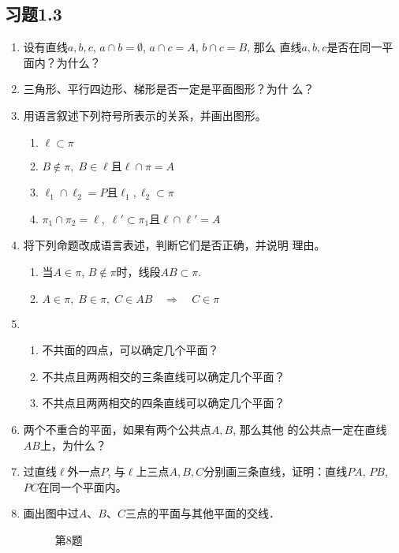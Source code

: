 \subsection*{习题1.3}
\begin{enumerate}
  \item 设有直线$a,b,c$, $a\cap b=\emptyset$, $a\cap c=A$, $b\cap c=B$, 那么
直线$a,b,c$是否在同一平面内？为什么？
\item 三角形、平行四边形、梯形是否一定是平面图形？为什
么？
\item 用语言叙述下列符号所表示的关系，并画出图形。
\begin{enumerate}
  \item $\ell\subset \pi$
  \item $B\notin \pi,\; B\in \ell$且$\ell\cap\pi=A$
  \item $\ell_1\cap \ell_2=P$且$\ell_1,\ell_2\subset \pi$
  \item $\pi_1\cap \pi_2=\ell,\; \ell'\subset \pi_1$且$\ell\cap \ell'=A$
\end{enumerate}


\item 将下列命题改成语言表述，判断它们是否正确，并说明
理由。
\begin{enumerate}
  \item 当$A\in \pi$, $B\notin \pi$时，线段$AB\subset \pi$.
  \item $A\in\pi,\; B\in\pi,\; C\in AB\quad \Rightarrow\quad C\in\pi $
\end{enumerate}

\item 
\begin{enumerate}
  \item 不共面的四点，可以确定几个平面？
  \item 不共点且两两相交的三条直线可以确定几个平面？
  \item 不共点且两两相交的四条直线可以确定几个平面？
\end{enumerate}

\item 两个不重合的平面，如果有两个公共点$A,B$, 那么其他
的公共点一定在直线$AB$上，为什么？
\item 过直线$\ell$外一点$P$, 与$\ell$上三点$A,B,C$分别画三条直线，证明：直线$PA$, $PB$, $PC$在同一个平面内。
\item 画出图中过$A$、$B$、$C$三点的平面与其他平面的交线．
\begin{figure}[htp]
  \centering
  
  \caption*{第8题}
\end{figure}
\end{enumerate}



